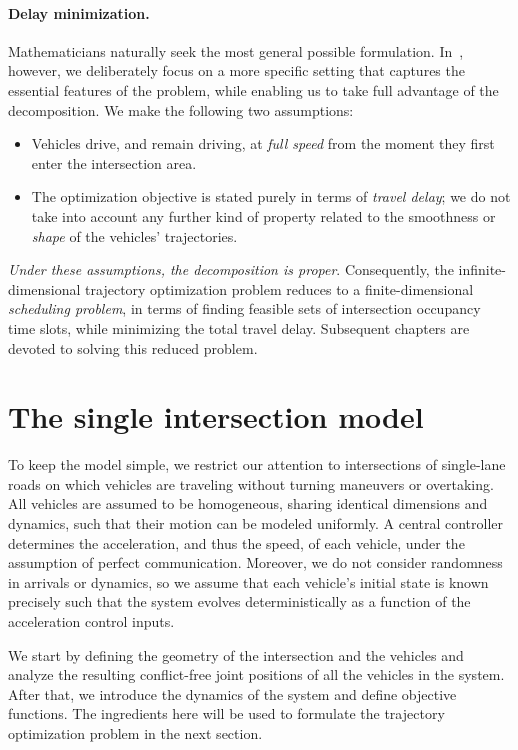 \documentclass{report}
\theoremstyle{definition}
\theoremstyle{plain}
\begin{document}
\paragraph{Delay minimization.}

Mathematicians naturally seek the most general possible
formulation. In~, however, we deliberately focus on
a more specific setting that captures the essential features of the problem,
while enabling us to take full advantage of the decomposition.
%
We make the following two assumptions:
\begin{itemize}
  \item Vehicles drive, and remain driving, at \emph{full speed} from the
        moment they first enter the intersection area.
  \item The optimization objective is stated purely in terms of \emph{travel delay};
        we do not take into account any further kind of property related to the
        smoothness or \emph{shape} of the vehicles' trajectories.
\end{itemize}
%
\emph{Under these assumptions, the decomposition is proper}. Consequently, the
infinite-dimensional trajectory optimization problem reduces to a
finite-dimensional \emph{scheduling problem}, in terms of finding feasible sets
of intersection occupancy time slots, while minimizing the total travel delay.
%
Subsequent chapters are devoted to solving this reduced problem.

\section{The single intersection model}\label{sec:intersection-model}

To keep the model simple, we restrict our attention to intersections of
single-lane roads on which vehicles are traveling without turning maneuvers or
overtaking.
%
All vehicles are assumed to be homogeneous, sharing identical dimensions and
dynamics, such that their motion can be modeled uniformly.
%
A central controller determines the acceleration, and thus the speed, of each
vehicle, under the assumption of perfect communication.
%
Moreover, we do not consider randomness in arrivals or dynamics, so we assume
that each vehicle's initial state is known precisely such that the system
evolves deterministically as a function of the acceleration control inputs.

We start by defining the geometry of the intersection and the vehicles and
analyze the resulting conflict-free joint positions of all the vehicles in the
system.
%
After that, we introduce the dynamics of the system and define objective
functions.
%
The ingredients here will be used to formulate the trajectory optimization
problem in the next section.
\end{document}
